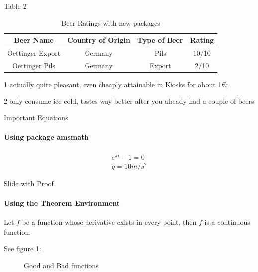 \documentclass[10pt]{beamer}
\begin{document}
\begin{frame}{Table 2}
\begin{table}[h]
\begin{center}
\begin{threeparttable}
\begin{tabular}{c c c c}
    \toprule
    \textbf{Beer Name} & \textbf{Country of Origin} & \textbf{Type of Beer} & \textbf{Rating} \\ 
    \midrule
      Oettinger Export\tnote{1}   & Germany & Pils & 10/10 \\
      Oettinger Pils\tnote{2}   & Germany & Export & 2/10 \\ 
      \bottomrule
\end{tabular}
\begin{tablenotes}
\item[1] \footnotesize actually quite pleasant, even cheaply attainable in Kiosks for about 1€; \item[2] \footnotesize only consume ice cold, tastes way better after you already had a couple of beers
\end{tablenotes}
\end{threeparttable}
\end{center}
\caption{Beer Ratings with new packages}{}
\label{table:2}
\end{table}
\end{frame}

\begin{frame}{Important Equations}
\framesubtitle{Using package amsmath}
	\begin{gather}
	  	e^{\pi i}  - 1 = 0 \\
	 	 g = 10 m/s^2
	\end{gather}
\end{frame}

\begin{frame}{Slide with Proof}
\framesubtitle{Using the Theorem Environment}

	\begin{theorem}
	Let \(f\) be a function whose derivative exists in every point, then \(f\) 
	is a continuous function.
	\end{theorem}
	See figure \ref{figure1}:

	\begin{figure}
		\centering 
		\qquad
		\caption{Good and Bad functions}
		\label{figure1}
	\end{figure}

\end{frame}
\end{document}
